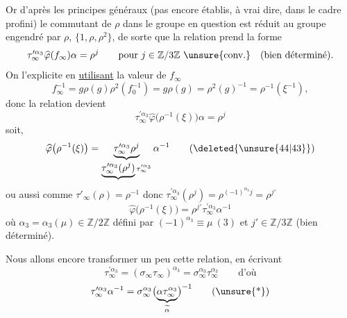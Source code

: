 

Or d'après les principes généraux (pas encore établis, à vrai dire, dans le cadre profini) le commutant de $\rho$ dans le groupe en question est réduit au groupe engendré par $\rho$, $\{1,\rho,\rho^2\}$, de sorte que la relation \unsure{(*)} prend la forme
\[
\tau_\infty^{\prime\alpha_3}\widehat{\varphi}(f_\infty)\alpha=\rho^j
\qquad\text{pour }j\in\mathbb Z/3\mathbb Z\ \unsure{\text{conv.}}
\quad\text{(bien déterminé)}.
\]
On l'explicite en \uline{utilisant} la valeur de $f_\infty$
\[
f_\infty^{-1}=g\rho(g)\rho^2(f_0^{-1})
=g\rho(g)=\rho^2(g)^{-1}=\rho^{-1}(\xi^{-1}),
\]
donc la relation  devient
\[
\tau_\infty^{\prime\alpha_3}\widehat{\varphi}\bigl(\rho^{-1}(\xi)\bigr)\alpha=\rho^j
\]
soit, 
\[
\widehat{\varphi}\bigl(\rho^{-1}(\xi)\bigr)
=\underbrace{\tau_\infty^{\prime\alpha_3}\rho^j}_{\underbrace{\tau_\infty^{\prime\alpha_3}(\rho^j)}\tau_\infty^{\prime\alpha_3}}\alpha^{-1}
\tag{\deleted{\unsure{44|43}}}
\]
ou aussi
\deleted{\[
\widehat{\varphi}\bigl(\rho^{-1}(\xi^{-1})\bigr)=\alpha\rho^{-j}\tau_\infty^{\prime\alpha_3}.
\tag{\unsure{44 bis|43 bis}}
\]}
comme $\tau'_\infty(\rho)=\rho^{-1}$ donc
$\tau_\infty^{\prime\alpha_3}(\rho^j)=\rho^{(-1)^{\alpha_3}j}=\rho^{j'}$
\[
\widehat{\varphi}\bigl(\rho^{-1}(\xi)\bigr)=\rho^{j'}\tau_\infty^{\prime\alpha_3}\alpha^{-1}
\tag{44}
\]
où $\alpha_3=\alpha_3(\mu)\in\mathbb Z/2\mathbb Z$ défini par $(-1)^{\alpha_3}\equiv\mu\ (3)$ et $j'\in\mathbb Z/3\mathbb Z$ (bien déterminé).

Nous allons encore transformer un peu cette relation, en écrivant
\[
\tau_\infty^{\prime\alpha_3}=(\sigma_\infty\tau_\infty)^{\alpha_3}=\sigma_\infty^{\alpha_3}\tau_\infty^{\alpha_3}
\qquad\text{d'où}
\]
\[
\tau_\infty^{\prime\alpha_3}\alpha^{-1}=\sigma_\infty^{\alpha_3}\bigl(\underbrace{\alpha\tau_\infty^{\alpha_3}}_{\widetilde\alpha}\bigr)^{-1}
\tag{\unsure{*}}
\]



